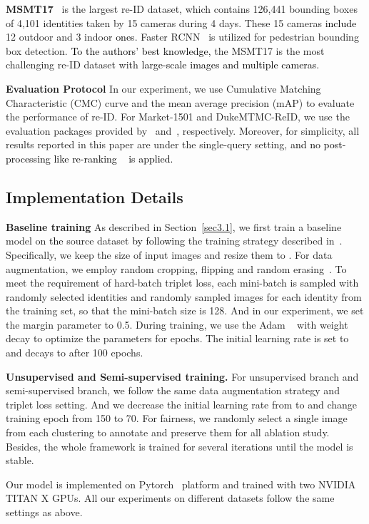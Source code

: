 \documentclass[10pt,twocolumn,letterpaper]{article}
\newcommand{\re}{\textcolor{black}}
\begin{document}
{\bf MSMT17}~\cite{wei2017person} is the largest re-ID dataset, which contains 126,441 bounding boxes of 4,101 identities taken by 15 cameras during 4 days. These 15 cameras \re{include} 12 outdoor and 3 indoor \re{ones}. Faster RCNN~\cite{ren2015faster} is utilized for pedestrian bounding box detection. \re{To the authors' best knowledge,} the MSMT17 is the most challenging re-ID dataset with \re{large-scale images and multiple cameras}.

{\bf Evaluation Protocol}
In our experiment, we use Cumulative Matching Characteristic (CMC) curve and the mean average precision (mAP) to evaluate the performance of re-ID. For Market-1501 and DukeMTMC-ReID, we use the evaluation packages provided by~\cite{zheng2015scalable} and~\cite{zheng2017unlabeled}, respectively. Moreover, for simplicity, all results reported in this paper are under the single-query setting, \re{and no post-processing like re-ranking ~\cite{zhong2017re} is applied.}\subsection{Implementation Details}
{\bf Baseline training} As described in Section~\ref{sec3.1}, we first train a baseline model on \re{the} source dataset \re{by following} the training strategy described in~\cite{zhong2018camera}. Specifically, we keep the size of input images and resize them to . For data augmentation, we employ random cropping, flipping and random erasing~\cite{zhong2017random}. To meet the requirement of hard-batch triplet loss, each mini-batch is sampled with randomly selected  identities and randomly sampled  images for each identity from the training set, so that the mini-batch size is 128. And in our experiment, we set the margin parameter to 0.5. During training, we use the Adam ~\cite{kingma2014adam} with weight decay  to optimize the parameters for  epochs. The initial learning rate is set to  and decays to  after 100 epochs.

{\bf Unsupervised and Semi-supervised training.} For unsupervised branch and semi-supervised branch, we follow the same data augmentation strategy and triplet loss setting. And we decrease the initial learning rate from  to  and change training epoch from 150 to 70. For fairness, we randomly select a single image from each clustering to annotate and preserve them for all ablation study. Besides, the whole framework is trained for several iterations until the model is stable.

Our model is implemented on Pytorch~\cite{paszke2017automatic} platform and trained with two NVIDIA TITAN X GPUs. All our experiments on different datasets follow the same settings as above.
\end{document}
